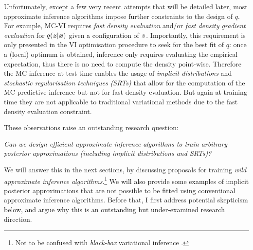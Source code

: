 Unfortunately, except a few very recent attempts that will be detailed later, most approximate inference algorithms impose further constraints to the design of $q$. For example, MC-VI requires \emph{fast density evaluation} and/or \emph{fast density gradient evaluation} for $q(\bm{z} | \bm{x})$ given a configuration of $\bm{z}$. Importantly, this requirement is only presented in the VI optimisation procedure to seek for the best fit of $q$: once a (local) optimum is obtained, inference only requires evaluating the empirical expectation, thus there is no need to compute the density point-wise. Therefore the MC inference at test time enables the usage of \emph{implicit distributions} \citep{diggle:prescribe_implicit1984,mohamed:gan2016} and \emph{stochastic regularisation techniques (SRTs)} \citep[e.g.~dropout techniques, see][]{srivastava:dropout2014, wan:dropconnect2013, singh:swapout2016, krueger:zoneout2017, kingma:variational_dropout2015, gal:uncertainty2016} that allow for the computation of the MC predictive inference but not for fast density evaluation. But again at training time they are not applicable to traditional variational methods due to the fast density evaluation constraint. 

These observations raise an outstanding research question: 
\begin{center}
\emph{Can we design efficient approximate inference algorithms to train arbitrary posterior approximations (including implicit distributions and SRTs)?}
\end{center}

We will answer this in the next sections, by discussing proposals for training \emph{wild approximate inference algorithms}.\footnote{Not to be confused with \emph{black-box} variational inference \citep{ranganath:bbvi2014}.} We will also provide some examples of implicit posterior approximations that are not possible to be fitted using conventional approximate inference algorithms. Before that, I first address potential skepticism below, and argue why this is an outstanding but under-examined research direction.

